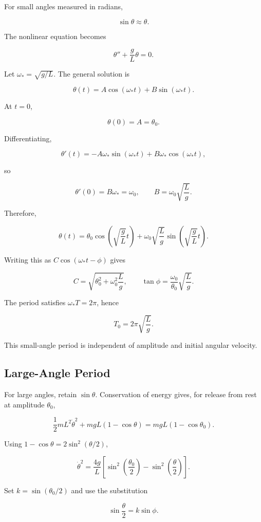 \documentclass[12pt, a4paper]{article}
\theoremstyle{break}
\begin{document}
For small angles measured in radians,

\[
\sin\theta\approx\theta.
\]

The nonlinear equation becomes

\[
\theta''+\frac gL\theta=0.
\]

Let \(\omega_* =\sqrt{g/L}\). The general solution is

\[
\theta(t)=A\cos(\omega_*t)+B\sin(\omega_*t).
\]

At \(t=0\),

\[
\theta(0)=A=\theta_0.
\]

Differentiating,

\[
\theta'(t)=-A\omega_*\sin(\omega_*t)+B\omega_*\cos(\omega_*t),
\]

so

\[
\theta'(0)=B\omega_*=\omega_0,
\qquad
B=\omega_0\sqrt{\frac Lg}.
\]

Therefore,

\[
\boxed{\theta(t)=\theta_0\cos\left(\sqrt{\frac gL}t\right)
+\omega_0\sqrt{\frac Lg}\sin\left(\sqrt{\frac gL}t\right)}.
\]

Writing this as \(C\cos(\omega_*t-\phi)\) gives

\[
C=\sqrt{\theta_0^2+\omega_0^2\frac Lg},
\qquad
\tan\phi=\frac{\omega_0}{\theta_0}\sqrt{\frac Lg}.
\]

The period satisfies \(\omega_*T=2\pi\), hence

\[
\boxed{T_0=2\pi\sqrt{\frac Lg}}.
\]

This small-angle period is independent of amplitude and initial angular velocity.

\subsection{Large-Angle Period}\label{large-angle-period}

For large angles, retain \(\sin\theta\). Conservation of energy gives, for release from rest at amplitude \(\theta_0\),

\[
\frac12mL^2\dot\theta^2+mgL(1-\cos\theta)
=mgL(1-\cos\theta_0).
\]

Using \(1-\cos\theta=2\sin^2(\theta/2)\),

\[
\dot\theta^2=\frac{4g}{L}
\left[\sin^2\left(\frac{\theta_0}{2}\right)-
\sin^2\left(\frac\theta2\right)\right].
\]

Set \(k=\sin(\theta_0/2)\) and use the substitution

\[
\sin\frac\theta2=k\sin\phi.
\]
\end{document}
